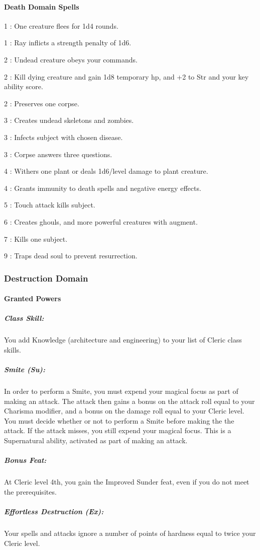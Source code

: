 \paragraph{Death Domain Spells}
\begin{list}{}{\leftmargin=1em}
\item[1] : One creature flees for 1d4 rounds.
\item[1] : Ray inflicts a strength penalty of 1d6.
\item[2] : Undead creature obeys your commands.
\item[2] : Kill dying creature and gain 1d8 temporary hp, and +2 to Str and your key ability score.
\item[2] : Preserves one corpse.
\item[3] : Creates undead skeletons and zombies.
\item[3] : Infects subject with chosen disease.
\item[3] : Corpse answers three questions.
\item[4] : Withers one plant or deals 1d6/level damage to plant creature.
\item[4] : Grants immunity to death spells and negative energy effects.
\item[5] : Touch attack kills subject.
\item[6] : Creates ghouls, and more powerful creatures with augment.
\item[7] : Kills one subject.
\item[9] : Traps dead soul to prevent resurrection.
\end{list}
\subsubsection{Destruction Domain}
\paragraph{Granted Powers}
\subparagraph{Class Skill:} 
You add Knowledge (architecture and engineering) to your list of Cleric class skills.
\subparagraph{Smite (Su):}
In order to perform a Smite, you must expend your magical focus as part of making an attack.
The attack then gains a bonus on the attack roll equal to your Charisma modifier, and a bonus on the damage roll equal to your Cleric level.
You must decide whether or not to perform a Smite before making the the attack. 
If the attack misses, you still expend your magical focus.
This is a Supernatural ability, activated as part of making an attack.
\subparagraph{Bonus Feat:}
At Cleric level 4th, you gain the Improved Sunder feat, even if you do not meet the prerequisites.
\subparagraph{Effortless Destruction (Ex):}
Your spells and attacks ignore a number of points of hardness equal to twice your Cleric level.
